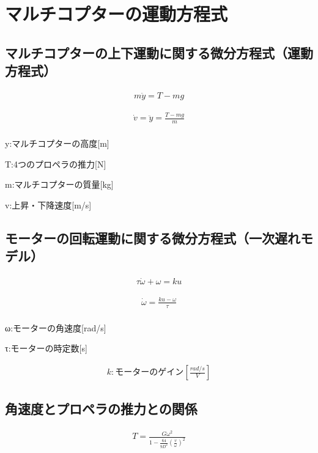 \chapter{マルチコプターの運動方程式}

\section{マルチコプターの上下運動に関する微分方程式（運動方程式）}

\begin{eqnarray}
m\ddot{y}=T-mg
\end{eqnarray}


\begin{eqnarray}
\dot{v}=\ddot{y}=\frac{T-mg}{m}\\
\end{eqnarray}

y:マルチコプターの高度[m]

T:4つのプロペラの推力[N]

m:マルチコプターの質量[kg]

v:上昇・下降速度[m/s]


\section{モーターの回転運動に関する微分方程式（一次遅れモデル）}

\begin{eqnarray}
τ\dot{ω}+ω=ku
\end{eqnarray}

\begin{eqnarray}
\dot{ω}=\frac{ku-ω}{τ}\\
\end{eqnarray}

ω:モーターの角速度[rad/s]

τ:モーターの時定数[s]

\begin{eqnarray}
k:モーターのゲイン[\frac{rad/s}{V}]
\end{eqnarray}

\section{角速度とプロペラの推力との関係}


\begin{eqnarray}
T=\frac{Gω^2}{{1-\frac{64}{9D^2}}{(\frac{v}{ω})^2}}
\end{eqnarray}

